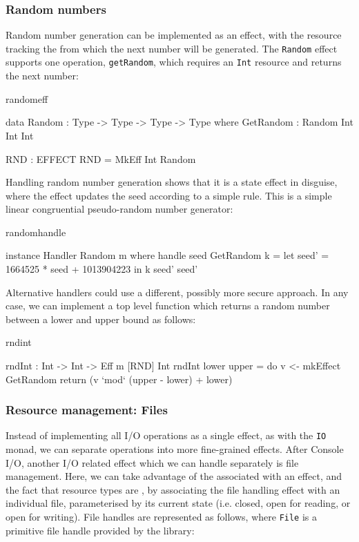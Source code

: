 \subsubsection{Random numbers}

Random number generation can be implemented as an effect, with the resource
tracking the  from which the next number will be generated.
The \texttt{Random} effect supports one operation, \texttt{getRandom}, which
requires an \texttt{Int} resource and returns the next number:

\begin{SaveVerbatim}{randomeff}

data Random : Type -> Type -> Type -> Type where
     GetRandom : Random Int Int Int

RND : EFFECT
RND = MkEff Int Random

\end{SaveVerbatim}

\noindent
Handling random number generation shows that it is a state effect in
disguise, where the effect updates the seed according to a simple rule.
This is a simple linear congruential pseudo-random number generator:

\begin{SaveVerbatim}{randomhandle}

instance Handler Random m where
    handle seed GetRandom k
         = let seed' = 1664525 * seed + 1013904223 in
               k seed' seed'

\end{SaveVerbatim}

\noindent
Alternative handlers could use a different, possibly more secure approach.
In any case, we can implement a top level function which returns a random
number between a lower and upper bound as follows:

\begin{SaveVerbatim}{rndint}

rndInt : Int -> Int -> Eff m [RND] Int
rndInt lower upper 
    = do v <- mkEffect GetRandom 
         return (v `mod` (upper - lower) + lower)

\end{SaveVerbatim}

\subsubsection{Resource management: Files}

Instead of implementing all I/O operations as a single effect, as with the
\texttt{IO} monad, we can separate operations into more fine-grained effects.
After Console I/O, another I/O related effect which we can handle separately
is file management. Here, we can take advantage of the 
associated with an effect, and the fact that resource types are ,
by associating the file handling effect with an individual file, parameterised
by its current state (i.e. closed, open for reading, or open for writing).
File handles are represented as follows, where \texttt{File} is a primitive
file handle provided by the \Idris{} library:

